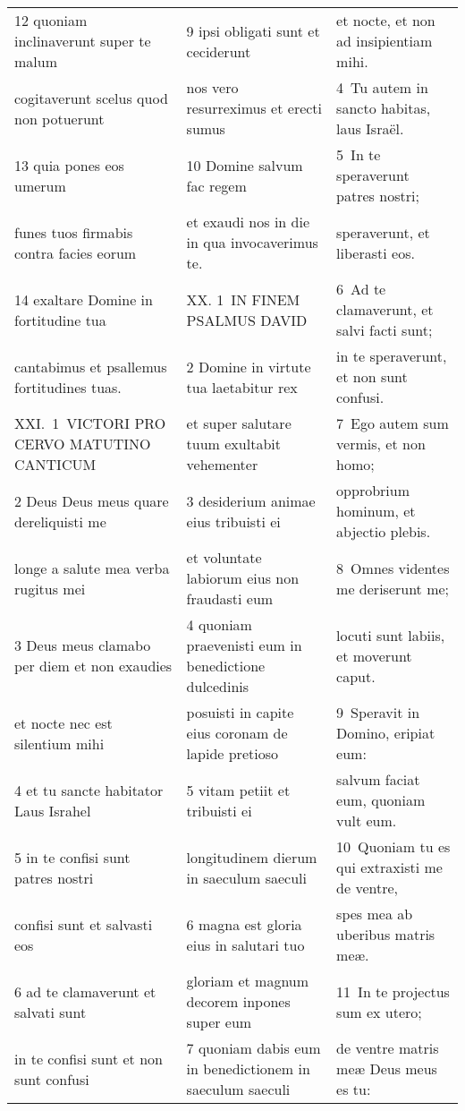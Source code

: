 \documentclass{article}
\begin{document}
\begin{longtable}{@{}p{}p{}p{}@{}}
12 quoniam inclinaverunt super te malum	&	9 ipsi obligati sunt et ceciderunt	&	et nocte, et non ad insipientiam mihi.	\\
cogitaverunt scelus quod non potuerunt	&	nos vero resurreximus et erecti sumus	&	4 Tu autem in sancto habitas, laus Israël.	\\
13 quia pones eos umerum	&	10 Domine salvum fac regem	&	5 In te speraverunt patres nostri;	\\
funes tuos firmabis contra facies eorum	&	et exaudi nos in die in qua invocaverimus te.	&	speraverunt, et liberasti eos.	\\
14 exaltare Domine in fortitudine tua	&	XX. 1 IN FINEM PSALMUS DAVID	&	6 Ad te clamaverunt, et salvi facti sunt;	\\
cantabimus et psallemus fortitudines tuas.	&	2 Domine in virtute tua laetabitur rex	&	in te speraverunt, et non sunt confusi.	\\
XXI. 1 VICTORI PRO CERVO MATUTINO CANTICUM	&	et super salutare tuum exultabit vehementer	&	7 Ego autem sum vermis, et non homo;	\\
2 Deus Deus meus quare dereliquisti me	&	3 desiderium animae eius tribuisti ei	&	opprobrium hominum, et abjectio plebis.	\\
longe a salute mea verba rugitus mei	&	et voluntate labiorum eius non fraudasti eum	&	8 Omnes videntes me deriserunt me;	\\
3 Deus meus clamabo per diem et non exaudies	&	4 quoniam praevenisti eum in benedictione dulcedinis	&	locuti sunt labiis, et moverunt caput.	\\
et nocte nec est silentium mihi	&	posuisti in capite eius coronam de lapide pretioso	&	9 Speravit in Domino, eripiat eum:	\\
4 et tu sancte habitator Laus Israhel	&	5 vitam petiit et tribuisti ei	&	salvum faciat eum, quoniam vult eum.	\\
5 in te confisi sunt patres nostri	&	longitudinem dierum in saeculum saeculi	&	10 Quoniam tu es qui extraxisti me de ventre,	\\
confisi sunt et salvasti eos	&	6 magna est gloria eius in salutari tuo	&	spes mea ab uberibus matris meæ.	\\
6 ad te clamaverunt et salvati sunt	&	gloriam et magnum decorem inpones super eum	&	11 In te projectus sum ex utero;	\\
in te confisi sunt et non sunt confusi	&	7 quoniam dabis eum in benedictionem in saeculum saeculi	&	de ventre matris meæ Deus meus es tu:	\\

\end{longtable}
\end{document}
